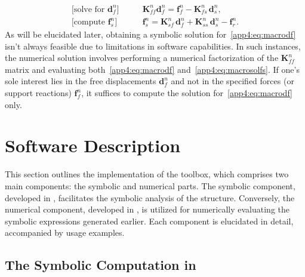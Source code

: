 %
\begin{subequations}
  \label{app4:eq:macrosol}
  \begin{align}
    \textrm{[solve for $\mathbf{d}^{n}_{f}$]} \qquad &\mathbf{K}^{n}_{ff}\mathbf{d}^{n}_{f} = \mathbf{f}^{n}_{f} - \mathbf{K}^{n}_{fs}\,\mathbf{d}^{n}_{s} \label{app4:eq:macrodf} \text{,} \\
    \textrm{[compute $\mathbf{f}^{n}_{s}$]} \qquad &\mathbf{f}^{n}_{s} = \mathbf{K}^{n}_{sf}\,\mathbf{d}^{n}_{f} + \mathbf{K}^{n}_{ss}\,\mathbf{d}^{n}_{s} - \mathbf{f}^{n}_{r} \text{.} \label{app4:eq:macrosolfs}
  \end{align}
\end{subequations}
%
As will be elucidated later, obtaining a symbolic solution for~\eqref{app4:eq:macrodf} isn't always feasible due to limitations in software capabilities. In such instances, the numerical solution involves performing a numerical factorization of the $\mathbf{K}^{n}_{ff}$ matrix and evaluating both~\eqref{app4:eq:macrodf} and~\eqref{app4:eq:macrosolfs}. If one's sole interest lies in the free displacements $\mathbf{d}^{n}_{f}$ and not in the specified forces (or support reactions) $\mathbf{f}^{n}_{f}$, it suffices to compute the solution for~\eqref{app4:eq:macrodf} only.


\section{Software Description}
\label{app4:sec:software_description}

This section outlines the implementation of the \TrussMe{} toolbox, which comprises two main components: the symbolic and numerical parts. The symbolic component, developed in \Maple{}, facilitates the symbolic analysis of the structure. Conversely, the numerical component, developed in \Matlab{}, is utilized for numerically evaluating the symbolic expressions generated earlier. Each component is elucidated in detail, accompanied by usage examples.

\subsection{The Symbolic Computation in \Maple{}}
\label{app4:subsec:symbolic_computation}

